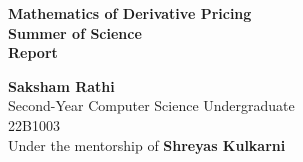 \documentclass{report}
\begin{document}
\begin{titlepage}
\centering
\vspace*{\fill}

\textbf{\Huge Mathematics of Derivative Pricing} \\
\vspace{0.5cm}
\textbf{\LARGE Summer of Science} \\
\vspace{0.5cm}
\textbf{\Large Report} \\
\vspace{14cm}

\textbf{\LARGE Saksham Rathi}\\
\large Second-Year Computer Science Undergraduate\\
\large 22B1003\\
\large Under the mentorship of \textbf{Shreyas Kulkarni}\\
\end{titlepage}


\tableofcontents

\end{document}
